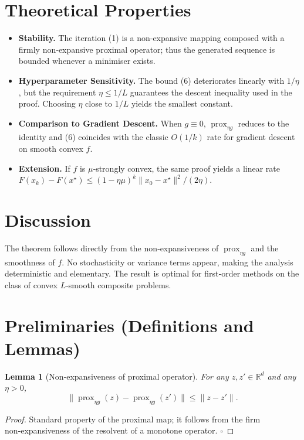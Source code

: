 \documentclass{article}
\newtheorem{lemma}{Lemma}
\newcommand{\prox}{\operatorname{prox}}
\newcommand{\R}{\mathbb{R}}
\begin{document}
\section*{Theoretical Properties}

\begin{itemize}
\item \textbf{Stability.} The iteration (1) is a non‑expansive mapping composed with a firmly non‑expansive proximal operator; thus the generated sequence is bounded whenever a minimiser exists.
\item \textbf{Hyperparameter Sensitivity.} The bound (6) deteriorates linearly with $1/\eta$, but the requirement $\eta\le1/L$ guarantees the descent inequality used in the proof. Choosing $\eta$ close to $1/L$ yields the smallest constant.
\item \textbf{Comparison to Gradient Descent.} When $g\equiv0$, $\prox_{\eta g}$ reduces to the identity and (6) coincides with the classic $O(1/k)$ rate for gradient descent on smooth convex $f$.
\item \textbf{Extension.} If $f$ is $\mu$‑strongly convex, the same proof yields a linear rate $F(x_{k})-F(x^{\star})\le (1-\eta\mu)^{k}\|x_{0}-x^{\star}\|^{2}/(2\eta)$.
\end{itemize}

\section*{Discussion}

The theorem follows directly from the non‑expansiveness of $\prox_{\eta g}$ and the smoothness of $f$. No stochasticity or variance terms appear, making the analysis deterministic and elementary. The result is optimal for first‑order methods on the class of convex $L$‑smooth composite problems.

\newpage
\section*{Preliminaries (Definitions and Lemmas)}

\begin{lemma}[Non‑expansiveness of proximal operator]\label{lem:nonexp}
For any $z,z'\in\R^{d}$ and any $\eta>0$,
\[
\bigl\| \prox_{\eta g}(z)-\prox_{\eta g}(z') \bigr\|\le \|z-z'\|.
\tag{7}
\]
\end{lemma}
\begin{proof}
Standard property of the proximal map; it follows from the firm non‑expansiveness of the resolvent of a monotone operator. \(\square\)
\end{proof}
\end{document}
